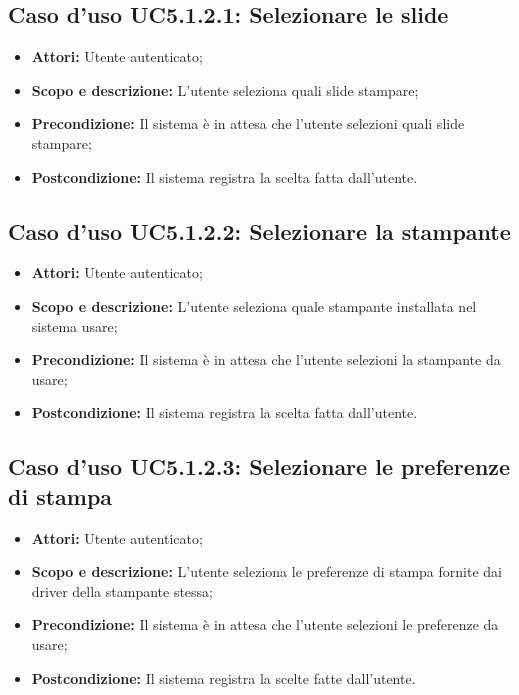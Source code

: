 		\subsection{Caso d'uso UC5.1.2.1: Selezionare le slide}
		\begin{itemize}
			\item \textbf{Attori:} Utente autenticato;
			\item \textbf{Scopo e descrizione:} L'utente seleziona quali slide stampare;
			\item \textbf{Precondizione:} Il sistema è in attesa che l'utente selezioni quali slide stampare;
			\item \textbf{Postcondizione:} Il sistema registra la scelta fatta dall'utente.
		\end{itemize}
		
		\subsection{Caso d'uso UC5.1.2.2: Selezionare la stampante}
		\begin{itemize}
			\item \textbf{Attori:} Utente autenticato;
			\item \textbf{Scopo e descrizione:} L'utente seleziona quale stampante installata nel sistema usare;
			\item \textbf{Precondizione:} Il sistema è in attesa che l'utente selezioni la stampante da usare;
			\item \textbf{Postcondizione:} Il sistema registra la scelta fatta dall'utente.
		\end{itemize}
		
		\subsection{Caso d'uso UC5.1.2.3: Selezionare le preferenze di stampa}
		\begin{itemize}
			\item \textbf{Attori:} Utente autenticato;
			\item \textbf{Scopo e descrizione:} L'utente seleziona le preferenze di stampa fornite dai driver della stampante stessa;
			\item \textbf{Precondizione:} Il sistema è in attesa che l'utente selezioni le preferenze da usare;
			\item \textbf{Postcondizione:} Il sistema registra la scelte fatte dall'utente.
		\end{itemize}
	

